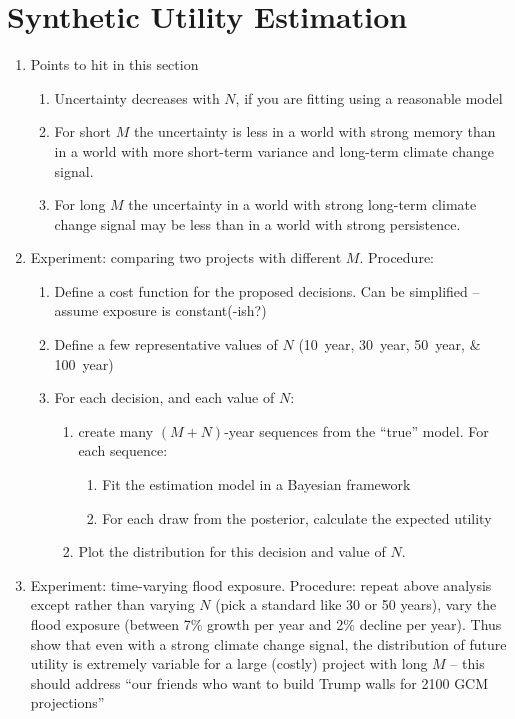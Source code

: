 \section{Synthetic Utility Estimation}

\begin{enumerate}
  \item Points to hit in this section
  \begin{enumerate}
    \item Uncertainty decreases with $N$, if you are fitting using a reasonable model
    \item For short $M$ the uncertainty is less in a world with strong memory than in a world with more short-term variance and long-term climate change signal.
    \item For long $M$ the uncertainty in a world with strong long-term climate change signal may be less than in a world with strong persistence.
  \end{enumerate}
  \item Experiment: comparing two projects with different $M$. Procedure:
  \begin{enumerate}
    \item Define a cost function for the proposed decisions. Can be simplified -- assume exposure is constant(-ish?)
    \item Define a few representative values of $N$ (\SIlist{10;30;50;100}{year})
    \item For each decision, and each value of $N$:
    \begin{enumerate}
      \item create many $(M+N)$-year sequences from the ``true'' model. For each sequence:
      \begin{enumerate}
        \item Fit the estimation model in a Bayesian framework
        \item For each draw from the posterior, calculate the expected utility
      \end{enumerate}
      \item Plot the distribution for this decision and value of $N$.
    \end{enumerate}
  \end{enumerate}
  \item Experiment: time-varying flood exposure. Procedure: repeat above analysis except rather than varying $N$ (pick a standard like 30 or 50 years), vary the flood exposure (\ie between 7\% growth per year and 2\% decline per year). Thus show that even with a strong climate change signal, the distribution of future utility is extremely variable for a large (costly) project with long $M$ -- this should address ``our friends who want to build Trump walls for 2100 GCM projections''
\end{enumerate}



